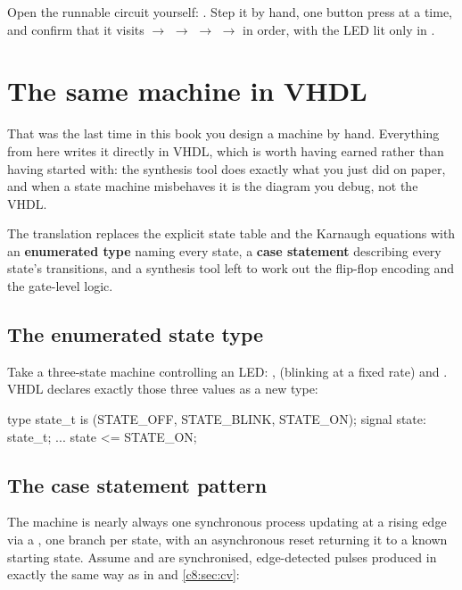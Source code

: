 Open the runnable circuit yourself: . Step it
by hand, one button press at a time, and confirm that it visits
 $\to$  $\to$  $\to$  $\to$
 in order, with the LED lit only in .

\section{The same machine in VHDL}
\label{c8:sec:vhdl}

That was the last time in this book you design a machine by hand. Everything from here writes it
directly in VHDL, which is worth having earned rather than having started with: the synthesis tool
does exactly what you just did on paper, and when a state machine misbehaves it is the diagram you
debug, not the VHDL.

The translation replaces the explicit state table and the Karnaugh equations with an
\textbf{enumerated type} naming every state, a \textbf{case statement} describing every state's
transitions, and a synthesis tool left to work out the flip-flop encoding and the gate-level logic.

\subsection*{The enumerated state type}
Take a three-state machine controlling an LED: ,  (blinking at a
fixed rate) and . VHDL declares exactly those three values as a new type:

\begin{vhdlcode}
type state_t is (STATE_OFF, STATE_BLINK, STATE_ON);
signal state: state_t;
...
state <= STATE_ON;
\end{vhdlcode}

\subsection*{The case statement pattern}
The machine is nearly always one synchronous process updating  at a rising edge via a
, one branch per state, with an asynchronous reset returning it to a known starting
state. Assume  and  are synchronised, edge-detected pulses
produced in exactly the same way as  in  and \ref{c8:sec:cv}:

